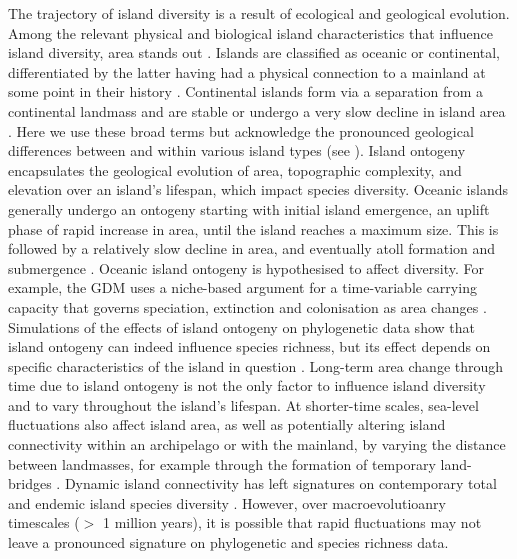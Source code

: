 \documentclass{article}
\begin{document}
The trajectory of island diversity is a result of ecological and geological evolution. Among the relevant physical and biological island characteristics that influence island diversity, area stands out \citep{ali_islands_2017}. Islands are classified as oceanic or continental, differentiated by the latter having had a physical connection to a mainland at some point in their history \citep{wallace_island_1880, ali_islands_2018}. Continental islands form via a separation from a continental landmass and are stable or undergo a very slow decline in island area \citep{ali_islands_2018}. Here we use these broad terms but acknowledge the pronounced geological differences between and within various island types (see \cite{ali_islands_2017, ali_islands_2018}). Island ontogeny encapsulates the geological evolution of area, topographic complexity, and elevation over an island’s lifespan, which impact species diversity. Oceanic islands generally undergo an ontogeny starting with initial island emergence, an uplift phase of rapid increase in area, until the island reaches a maximum size. This is followed by a relatively slow decline in area, and eventually atoll formation and submergence \citep{ramalho_coastal_2013, ali_islands_2017}. Oceanic island ontogeny is hypothesised to affect diversity. For example, the GDM uses a niche-based argument for a time-variable carrying capacity that governs speciation, extinction and colonisation as area changes \citep{whittaker_general_2008}. Simulations of the effects of island ontogeny on phylogenetic data show that island ontogeny can indeed influence species richness, but its effect depends on specific characteristics of the island in question \citep{valente_effects_2014}. Long-term area change through time due to island ontogeny is not the only factor to influence island diversity and to vary throughout the island’s lifespan. At shorter-time scales, sea-level fluctuations also affect island area, as well as potentially altering island connectivity within an archipelago or with the mainland, by varying the distance between landmasses, for example through the formation of temporary land-bridges \citep{ali_exploring_2014, fernandezpalacios_towards_2016, hammoud_past_2021}. Dynamic island connectivity has left signatures on contemporary total and endemic island species diversity \citep{weigelt_late_2016, norder_beyond_2019}. However, over macroevolutioanry timescales ($>$ 1 million years), it is possible that rapid fluctuations may not leave a pronounced signature on phylogenetic and species richness data. \\
\end{document}
